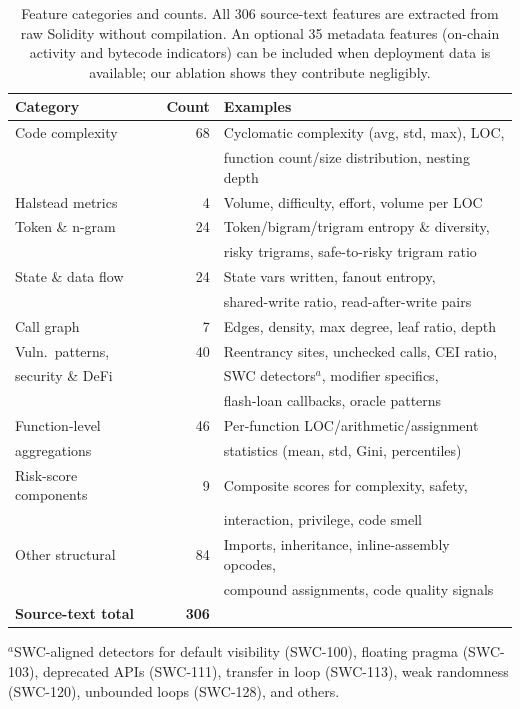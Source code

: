 \documentclass[11pt,a4paper]{article}
\begin{document}
\begin{table}[t]
\centering
\caption{Feature categories and counts. All 306 source-text features are extracted from raw Solidity without compilation. An optional 35 metadata features (on-chain activity and bytecode indicators) can be included when deployment data is available; our ablation shows they contribute negligibly.}
\label{tab:feature_categories}
\begin{tabular}{lrl}
\hline
\textbf{Category} & \textbf{Count} & \textbf{Examples} \\
\hline
Code complexity       &  68 & Cyclomatic complexity (avg, std, max), LOC, \\
                      &     & function count/size distribution, nesting depth \\
Halstead metrics      &   4 & Volume, difficulty, effort, volume per LOC \\
Token \& n-gram       &  24 & Token/bigram/trigram entropy \& diversity, \\
                      &     & risky trigrams, safe-to-risky trigram ratio \\
State \& data flow    &  24 & State vars written, fanout entropy, \\
                      &     & shared-write ratio, read-after-write pairs \\
Call graph            &   7 & Edges, density, max degree, leaf ratio, depth \\
Vuln.\ patterns,      &  40 & Reentrancy sites, unchecked calls, CEI ratio, \\
security \& DeFi      &     & SWC detectors$^a$, modifier specifics, \\
                      &     & flash-loan callbacks, oracle patterns \\
Function-level        &  46 & Per-function LOC/arithmetic/assignment \\
aggregations          &     & statistics (mean, std, Gini, percentiles) \\
Risk-score components &   9 & Composite scores for complexity, safety, \\
                      &     & interaction, privilege, code smell \\
Other structural      &  84 & Imports, inheritance, inline-assembly opcodes, \\
                      &     & compound assignments, code quality signals \\
\hline
\textbf{Source-text total} & \textbf{306} & \\
\hline
\end{tabular}

\vspace{2pt}
{\footnotesize $^a$SWC-aligned detectors for default visibility (SWC-100), floating pragma (SWC-103), deprecated APIs (SWC-111), transfer in loop (SWC-113), weak randomness (SWC-120), unbounded loops (SWC-128), and others.}
\end{table}
\end{document}
